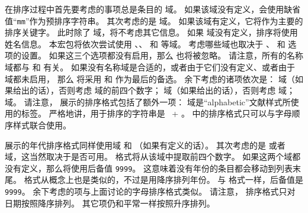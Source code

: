 在排序过程中首先要考虑的事项总是条目的  域。
如果该域没有定义，\biblatex 会使用缺省值“\texttt{mm}”作为预排序字符串。
其次考虑的是  域。
如果该域有定义，它将作为主要的排序关键字。
此时除了  域，将不考虑其它信息。
如果  域没有定义，排序将使用姓名信息。
本宏包将依次尝试使用 、、 和  等域。
考虑哪些域也取决于 、 和  选项的设置。
如果这三个选项都没有启用，那么  也将被忽略。
请注意，所有的名称域都与  和  有关。
如果没有名称域是合适的，或者由于它们没有定义、或者由于  域都未启用，
那么 \biblatex 将采用   和  作为最后的备选。
余下考虑的诸项依次是： 域（如果给出的话），否则考虑  域的前四个数字；
 域（如果给出的话），否则考虑   域；
 域。
请注意， 展示的排序格式包括了额外一项：
 域是“alphabetic”文献样式所使用的标签。
严格地讲，用于排序的字符串是 ~+ 。
 中的排序格式只可以与字母顺序样式联合使用。


 展示的年代排序格式同样使用域  和  （如果有定义的话）。
其次考虑的是  或者  域，这当然取决于是否可用。
 格式将从该域中提取前四个数字。
如果这两个域都没有定义，那么将使用后备值 \texttt{9999}。
这意味着没有年份的条目都会移动到列表末尾。
 格式从概念上也是类似的，不过是用降序排列年份。
与  格式一样，后备值是 \texttt{9999}。
余下考虑的项与上面讨论的字母排序格式类似。
请注意， 排序格式只对日期按照降序排列。
其它项仍和平常一样按照升序排列。


